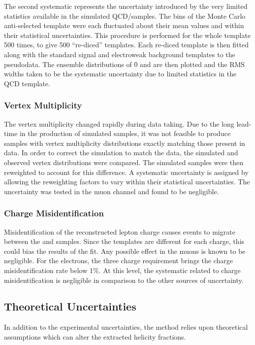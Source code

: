 The second systematic represents the uncertainty introduced by the very limited
statistics available in the simulated \ac{QCD}/\gammajets samples. The bins of
the Monte Carlo anti-selected template were each fluctuated about their mean
values and within their statistical uncertainties. This procedure is performed
for the whole template 500 times, to give 500 ``re-diced'' templates. Each
re-diced template is then fitted along with the standard signal and electroweak
background templates to the pseudodata. The ensemble distributions of \f0 and
\fLmfR are then plotted and the \ac{RMS} widths taken to be the systematic
uncertainty due to limited statistics in the \ac{QCD} template.

\subsubsection{Vertex Multiplicity}
The vertex multiplicity changed rapidly during data taking. Due to the long
lead-time in the production of simulated samples, it was not feasible to produce
samples with vertex multiplicity distributions exactly matching those present in
data. In order to correct the simulation to match the data, the simulated and
observed vertex distributions were compared. The simulated samples were then
reweighted to account for this difference. A systematic uncertainty is assigned
by allowing the reweighting factors to vary within their statistical
uncertainties. The uncertainty was tested in the muon channel and found to be
negligible.

\subsubsection{Charge Misidentification}
\label{sec:wpol_syst_charge_misid}
Misidentification of the reconstructed lepton charge causes events to migrate
between the \PWp and \PWm samples. Since the templates are different for each
charge, this could bias the results of the fit. Any possible effect in the muons
is known to be negligible. For the electrons, the three charge requirement
brings the charge misidentification rate below 1\%. At this level, the
systematic related to charge misidentification is negligible in comparison to
the other sources of uncertainty.


\subsection{Theoretical Uncertainties}
In addition to the experimental uncertainties, the method relies upon
theoretical assumptions which can alter the extracted helicity fractions.

